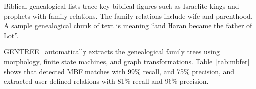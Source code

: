 Biblical genealogical lists trace key biblical figures such as Israelite kings and
prophets with family relations. 
The family relations include wife and parenthood. 
A sample genealogical chunk of text is  
meaning ``and Haran became the father of Lot''.

GENTREE~\cite{ZaMaHaCicling2012Entity} 
automatically extracts the genealogical family trees using morphology, 
finite state machines, and graph transformations. 
%
%
%
%
%
%
%
%
%
%
Table~\ref{tab:mbfer} shows that \framework detected 
MBF matches with 99\% recall, and 75\% precision, and
extracted user-defined relations with 81\% recall and 96\% precision.

